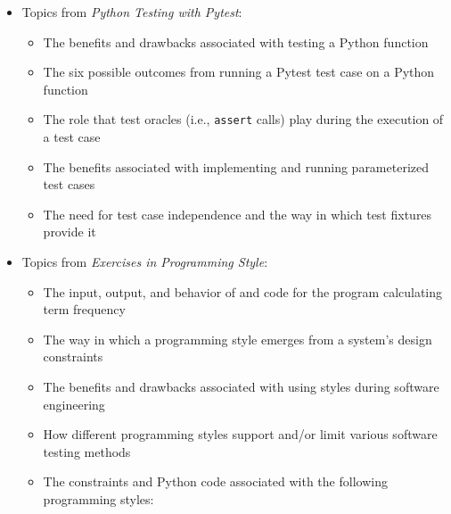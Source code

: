 \documentclass[11pt]{article}
\newcommand{\programmingstyle}{{\em Exercises in Programming Style\/}}
\newcommand{\pytest}{{\em Python Testing with Pytest\/}}
\newcommand{\program}[1]{\lstinline{#1}}
\begin{document}
\begin{itemize}
\begin{itemize}
    \end{itemize}

  \item Topics from \pytest{}:
    \vspace*{-.05in}
    \begin{itemize}

      \itemsep 0.05in

      \item The benefits and drawbacks associated with testing a Python function

      \item The six possible outcomes from running a Pytest test case on a
        Python function

      \item The role that test oracles (i.e., \program{assert} calls) play
        during the execution of a test case

      \item The benefits associated with implementing and running parameterized
        test cases

      \item The need for test case independence and the way in which test
        fixtures provide it

    \end{itemize}

  \item Topics from \programmingstyle{}:
    \vspace*{-.05in}
    \begin{itemize}

      \itemsep 0.05in

      \item The input, output, and behavior of and code for the program
        calculating term frequency

      \item The way in which a programming style emerges from a system's design constraints

      \item The benefits and drawbacks associated with using styles during
        software engineering

      \item How different programming styles support and/or limit various
        software testing methods

      \item The constraints and Python code associated with the following
        programming styles:


\end{itemize}
\end{itemize}
\end{document}
